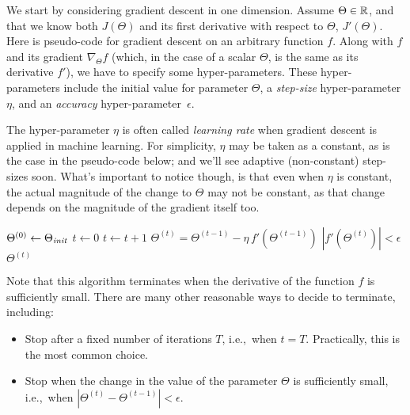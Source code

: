 We start by considering gradient descent in one dimension. Assume
$\Theta \in \mathbb{R}$, and that we know both $J(\Theta)$ and its first
derivative with respect to $\Theta$, $J'(\Theta)$.  Here is pseudo-code
for gradient descent on an arbitrary function $f$.  Along with $f$ and
its gradient
$\nabla_{\Theta}f$ (which, in the case of a scalar $\Theta$, is the same as its derivative $f'$),
we have to specify some hyper-parameters.
These hyper-parameters include the initial value for parameter $\Theta$, a {\em step-size}
hyper-parameter $\eta$, and an {\em accuracy} hyper-parameter~$\epsilon$.

The hyper-parameter $\eta$ is often called {\em learning rate} when
gradient descent is applied in machine learning. For simplicity, $\eta$ may be taken as a constant, as is the case in the pseudo-code below; and we'll see adaptive (non-constant) step-sizes soon. What's important to notice though, is that even when $\eta$ is constant, the actual magnitude of the
change to $\Theta$ may not be constant, as that change depends on the
magnitude of the gradient itself too.

\begin{codebox}
  \li $\Theta^{(0)} \gets \Theta_{\it init}$
  \li $t \gets 0$
  \li \Repeat
  \li   $t \gets t+1$
  \li   $\Theta^{(t)} = \Theta^{(t-1)} - \eta \, f'(\Theta^{(t-1)})$
  \li \Until $|f'(\Theta^{(t)})| < \epsilon$
  \li \Return $\Theta^{(t)}$
\end{codebox}
Note that this algorithm terminates when the derivative of the function $f$
is sufficiently small. There are many other reasonable ways to decide
to terminate, including:
\begin{itemize}
  \item Stop after a fixed number of iterations $T$, i.e.,\ when $t = T$. Practically, this is the most common choice.
  \item Stop when the change in the value of the parameter
        $\Theta$ is sufficiently small, i.e.,\ when $\left| \Theta^{(t)} - \Theta^{(t-1)} \right|
          <\epsilon$.
\end{itemize}


